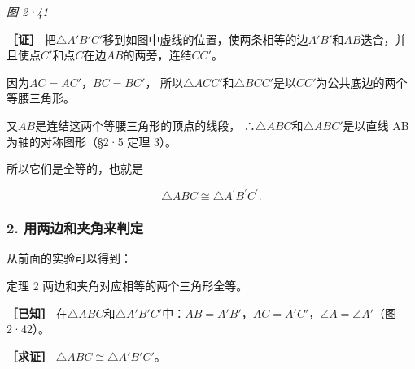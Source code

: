 \emph{图 2·41}

\textbf{［证］}
把\(\triangle A'B'C'\)移到如图中虚线的位置，使两条相等的边\(A'B'\)和\(AB\)迭合，并且使点\(C'\)和点\(C\)在边\(AB\)的两旁，连结\(CC'\)。

因为\(AC = AC'\)，\(BC = BC'\)，
所以\(\triangle ACC'\)和\(\triangle BCC'\)是以\(CC'\)为公共底边的两个等腰三角形。

又\(AB\)是连结这两个等腰三角形的顶点的线段，
∴\(\triangle ABC\)和\(\triangle ABC'\)是以直线 AB 为轴的对称图形（§2·5
定理 3）。

所以它们是全等的，也就是

\[
\triangle ABC \cong \triangle A ^{\prime} B ^{\prime} C ^{\prime}.
\]

\subsubsection{2.
用两边和夹角来判定}

从前面的实验可以得到：

定理 2 两边和夹角对应相等的两个三角形全等。

\textbf{［已知］}
在\(\triangle ABC\)和\(\triangle A'B'C'\)中：\(AB = A'B'\)，\(AC = A'C'\)，\(\angle A = \angle A'\)（图
2·42）。

\textbf{［求证］} \(\triangle ABC \cong \triangle A'B'C'\)。

